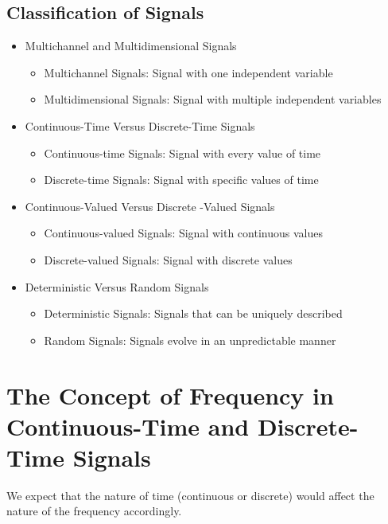 \documentclass[10pt,a4paper,oneside]{article}
\begin{document}
\subsection{Classification of Signals}
\begin{itemize}

\item Multichannel and Multidimensional Signals
\begin{itemize}
	\item  Multichannel Signals: Signal with one independent variable
	\item  Multidimensional Signals: Signal with multiple independent variables
\end{itemize}
\item Continuous-Time Versus Discrete-Time Signals
\begin{itemize}
	\item  Continuous-time Signals: Signal with every value of time
	\item  Discrete-time Signals: Signal with specific values of time
\end{itemize}
\item Continuous-Valued Versus Discrete -Valued Signals
\begin{itemize}
	\item  Continuous-valued Signals: Signal with continuous values
	\item  Discrete-valued Signals: Signal with discrete values
\end{itemize}
\item Deterministic Versus Random Signals
\begin{itemize}
	\item  Deterministic  Signals: Signals that can be uniquely described 
	\item  Random Signals: Signals evolve in an unpredictable manner
\end{itemize}
\end{itemize}

\section{The Concept of Frequency in Continuous-Time and Discrete-Time Signals}
We expect that the nature of time (continuous or discrete) would affect the nature of the frequency accordingly.
\end{document}
